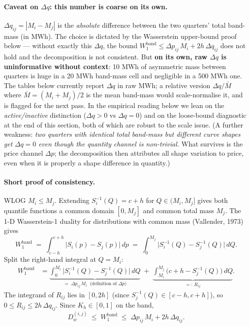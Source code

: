 \documentclass[11pt,a4paper]{article}
\begin{document}
\paragraph{Caveat on $\Delta q$: this number is coarse on its own.}
$\Delta q_{ij} = |M_i - M_j|$ is the \emph{absolute} difference between the two quarters' total band-mass (in MWh). The choice is dictated by the Wasserstein upper-bound proof below --- without exactly this $\Delta q$, the bound $W^{\text{band}}_1 \le \Delta p_{ij}\,M_i + 2h\,\Delta q_{ij}$ does not hold and the decomposition is not consistent. But \textbf{on its own, raw $\Delta q$ is uninformative without context}: 10 MWh of asymmetric mass between quarters is huge in a 20 MWh band-mass cell and negligible in a 500 MWh one. The tables below currently report $\Delta q$ in raw MWh; a relative version $\Delta q / \bar M$ where $\bar M = (M_i + M_j)/2$ is the mean band-mass would scale-normalise it, and is flagged for the next pass. In the empirical reading below we lean on the \emph{active/inactive} distinction ($\Delta q > 0$ vs $\Delta q = 0$) and on the loose-bound diagnostic at the end of this section, both of which are robust to the scale issue. (A further weakness: \emph{two quarters with identical total band-mass but different curve shapes get $\Delta q = 0$ even though the quantity channel is non-trivial.} What survives is the price channel $\Delta p$; the decomposition then attributes all shape variation to price, even when it is properly a shape difference in quantity.)

\paragraph{Short proof of consistency.}
WLOG $M_i \le M_j$. Extending $S_i^{-1}(Q) = c+h$ for $Q \in (M_i, M_j]$ gives both quantile functions a common domain $[0, M_j]$ and common total mass $M_j$. The 1-D Wasserstein-1 duality for distributions with common mass (Vallender, 1973) gives
\[
  W^{\text{band}}_1 \;=\; \int_{c-h}^{c+h}\!\big|S_i(p) - S_j(p)\big|\,dp
  \;=\; \int_{0}^{M_j}\!\big|S_i^{-1}(Q) - S_j^{-1}(Q)\big|\,dQ.
\]
Split the right-hand integral at $Q = M_i$:
\begin{align*}
  W^{\text{band}}_1
    &= \underbrace{\int_0^{M_i}\!\big|S_i^{-1}(Q) - S_j^{-1}(Q)\big|\,dQ}_{=\;\Delta p_{ij}\,M_i\;\;\text{(definition of $\Delta p$)}}
    \;+\; \underbrace{\int_{M_i}^{M_j}\!\big(c{+}h - S_j^{-1}(Q)\big)\,dQ}_{=:\,R_{ij}}.
\end{align*}
The integrand of $R_{ij}$ lies in $[0, 2h]$ (since $S_j^{-1}(Q) \in [c-h, c+h]$), so $0 \le R_{ij} \le 2h\,\Delta q_{ij}$. Since $K_h \in [0,1]$ on the band,
\[
  D^{(i,j)}_w \;\le\; W^{\text{band}}_1 \;\le\; \Delta p_{ij}\,M_i + 2h\,\Delta q_{ij}.
\]
\end{document}
